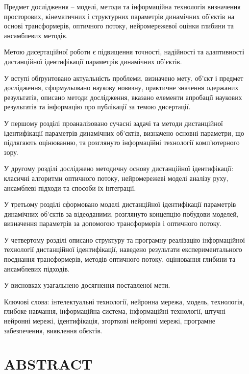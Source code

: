 \documentclass[
]{article}
\begin{document}
Предмет дослідження -- моделі, методи та інформаційна технологія визначення просторових, кінематичних і структурних параметрів динамічних об'єктів на основі трансформерів, оптичного потоку, нейромережевої оцінки глибини та ансамблевих методів.

Метою дисертаційної роботи є підвищення точності, надійності та адаптивності дистанційної ідентифікації параметрів динамічних об'єктів.

У вступі обґрунтовано актуальність проблеми, визначено мету, об'єкт і предмет дослідження, сформульовано наукову новизну, практичне значення одержаних результатів, описано методи дослідження, вказано елементи апробації наукових результатів та інформацію про публікації за темою дисертації.

У першому розділі проаналізовано сучасні задачі та методи дистанційної ідентифікації параметрів динамічних об'єктів, визначено основні параметри, що підлягають оцінюванню, та розглянуто інформаційні технології комп'ютерного зору.

У другому розділі досліджено методичну основу дистанційної ідентифікації: класичні алгоритми оптичного потоку, нейромережеві моделі аналізу руху, ансамблеві підходи та способи їх інтеграції.

У третьому розділі сформовано моделі дистанційної ідентифікації параметрів динамічних об'єктів за відеоданими, розглянуто концепцію побудови моделей, визначення параметрів за допомогою трансформерів і оптичного потоку.

У четвертому розділі описано структуру та програмну реалізацію інформаційної технології дистанційної ідентифікації, наведено результати експериментального поєднання трансформерів, методів оптичного потоку, оцінювання глибини та ансамблевих підходів.

У висновках узагальнено досягнення поставленої мети.

Ключові слова: інтелектуальні технології, нейронна мережа, модель, технологія, глибоке навчання, інформаційна система, інформаційні технології, штучні нейронні мережі, ідентифікація, згорткові нейронні мережі, програмне забезпечення, виявлення об\textquotesingle єктів.

\section{ABSTRACT}\label{abstract}
\end{document}

